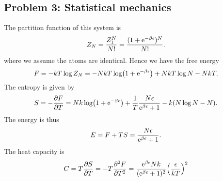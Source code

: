 \documentclass[10pt]{article}
\begin{document}
\subsection{Problem 3: Statistical mechanics}
The partition function of this system is 
\begin{equation}
	Z_N = \frac{Z_1^N}{N!} = \frac{(1+{\mathrm{e}}^{-\beta \epsilon})^N}{N!}.
\end{equation}
where we assume the atoms are identical. Hence we have the free energy 
\begin{equation}
	F = -k T \log{Z_N} = -NkT \log(1+ {\mathrm{e}}^{-\beta \epsilon}) + NkT \log{N} - NkT. 
\end{equation}
The entropy is given by 
\begin{equation}
	S = - \pdv{F}{T} = Nk \log(1+ {\mathrm{e}}^{-\beta\epsilon}) + \frac{1}{T} \frac{N \epsilon}{{\mathrm{e}}^{\beta \epsilon} + 1} - k (N \log N - N).
\end{equation}
The energy is thus 
\begin{equation}
	E = F + TS = \frac{N \epsilon}{{\mathrm{e}}^{\beta \epsilon} + 1}.
\end{equation}
The heat capacity is 
\begin{equation}
	C = T \pdv{S}{T} = - T \pdv[2]{F}{T} = \frac{{\mathrm{e}}^{\beta \epsilon}Nk}{({\mathrm{e}}^{\beta\epsilon} + 1)^2} \qty(\frac{\epsilon}{kT})^2
\end{equation}
\end{document}
